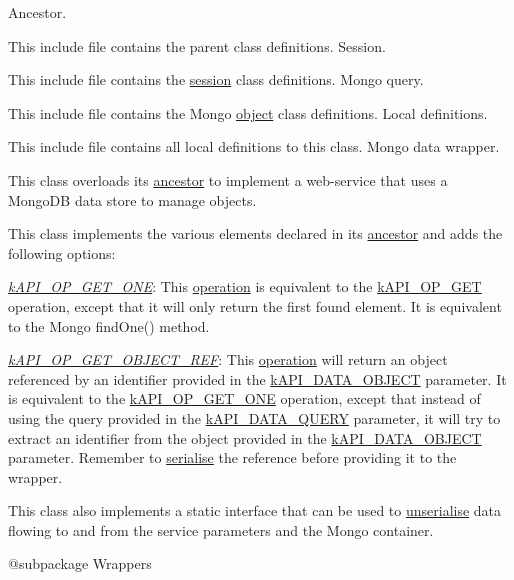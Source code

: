 Ancestor.

This include file contains the parent class definitions. Session.

This include file contains the \hyperlink{}{session} class definitions. Mongo query.

This include file contains the Mongo \hyperlink{class_c_mongo_query}{object} class definitions. Local definitions.

This include file contains all local definitions to this class. Mongo data wrapper.

This class overloads its \hyperlink{class_c_data_wrapper}{ancestor} to implement a web-\/service that uses a Mongo\-D\-B data store to manage objects.

This class implements the various elements declared in its \hyperlink{class_c_data_wrapper}{ancestor} and adds the following options\-:


\begin{DoxyItemize}
\item {\itshape \hyperlink{}{k\-A\-P\-I\-\_\-\-O\-P\-\_\-\-G\-E\-T\-\_\-\-O\-N\-E}}\-: This \hyperlink{}{operation} is equivalent to the \hyperlink{}{k\-A\-P\-I\-\_\-\-O\-P\-\_\-\-G\-E\-T} operation, except that it will only return the first found element. It is equivalent to the Mongo find\-One() method. 
\item {\itshape \hyperlink{}{k\-A\-P\-I\-\_\-\-O\-P\-\_\-\-G\-E\-T\-\_\-\-O\-B\-J\-E\-C\-T\-\_\-\-R\-E\-F}}\-: This \hyperlink{}{operation} will return an object referenced by an identifier provided in the \hyperlink{}{k\-A\-P\-I\-\_\-\-D\-A\-T\-A\-\_\-\-O\-B\-J\-E\-C\-T} parameter. It is equivalent to the \hyperlink{}{k\-A\-P\-I\-\_\-\-O\-P\-\_\-\-G\-E\-T\-\_\-\-O\-N\-E} operation, except that instead of using the query provided in the \hyperlink{}{k\-A\-P\-I\-\_\-\-D\-A\-T\-A\-\_\-\-Q\-U\-E\-R\-Y} parameter, it will try to extract an identifier from the object provided in the \hyperlink{}{k\-A\-P\-I\-\_\-\-D\-A\-T\-A\-\_\-\-O\-B\-J\-E\-C\-T} parameter. Remember to \hyperlink{class_c_data_type_a608d6fc184bce537ce83669f729d6008}{serialise} the reference before providing it to the wrapper. 
\end{DoxyItemize}

This class also implements a static interface that can be used to \hyperlink{}{unserialise} data flowing to and from the service parameters and the Mongo container.

\begin{DoxyVerb} @subpackage        Wrappers\end{DoxyVerb}


